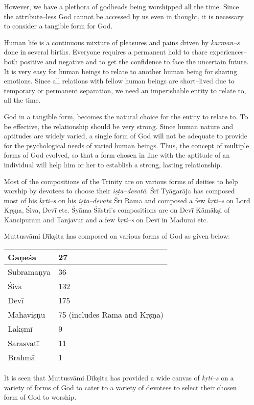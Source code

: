 However, we have a plethora of godheads being worshipped all the time. Since the attribute–less God cannot be accessed by us even in thought, it is necessary to consider a tangible form for God.

Human life is a continuous mixture of pleasures and pains driven by \textit{karman–s} done in several births. Everyone requires a permanent hold to share experiences– both positive and negative and to get the confidence to face the uncertain future. It is very easy for human beings to relate to another human being for sharing emotions. Since all relations with fellow human beings are short–lived due to temporary or permanent separation, we need an imperishable entity to relate to, all the time.

God in a tangible form, becomes the natural choice for the entity to relate to. To be effective, the relationship should be very strong. Since human nature and aptitudes are widely varied, a single form of God will not be adequate to provide for the psychological needs of varied human beings. Thus, the concept of multiple forms of God evolved, so that a form chosen in line with the aptitude of an individual will help him or her to establish a strong, lasting relationship.

Most of the compositions of the Trinity are on various forms of deities to help worship by devotees to choose their \textit{iṣṭa–devatā}. Śrī Tyāgarāja has composed most of his \textit{kṛti–s} on his \textit{iṣṭa–devatā} Śrī Rāma and composed a few \textit{kṛti–s} on Lord Kṛṣṇa, Śiva, Devī etc. Śyāma Śāstri’s compositions are on Devī Kāmākṣi of Kancipuram and Tanjavur and a few \textit{kṛti–s} on Devī in Madurai etc.

Muttusvāmi Dīkṣita has composed on various forms of God as given below:

\begin{tabular}{|l|l|}
\hline
Gaṇeśa & 27 \\
\hline
Subramaṇya & 36 \\
\hline
Śiva & 132 \\
\hline
Devī & 175 \\
\hline
Mahāviṣṇu & 75 (includes Rāma and Kṛṣṇa) \\
\hline
Lakṣmī & 9 \\
\hline
Sarasvatī & 11 \\
\hline
Brahmā & 1 \\
\hline
\end{tabular}

It is seen that Muttusvāmi Dīkṣita has provided a wide canvas of \textit{kṛti–s} on a variety of forms of God to cater to a variety of devotees to select their chosen form of God to worship.


